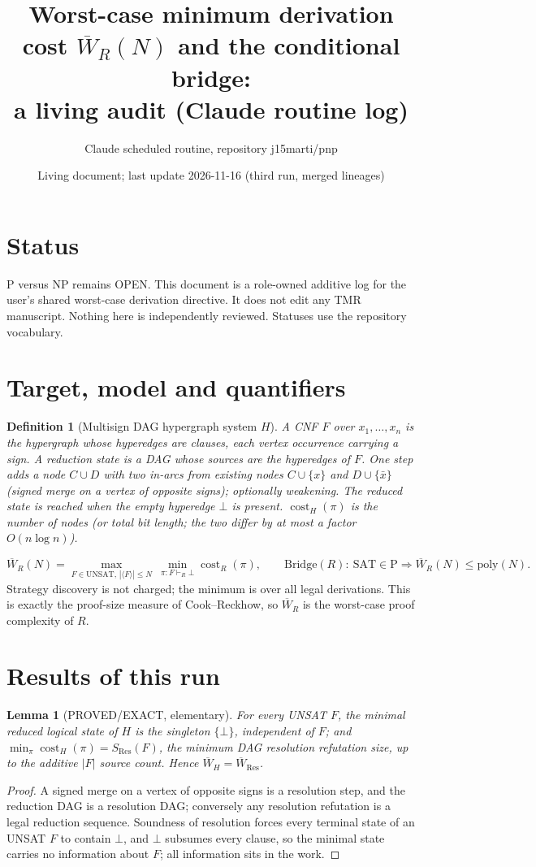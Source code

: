 \documentclass[11pt]{article}
\title{Worst-case minimum derivation cost $\overline W_R(N)$ and the conditional bridge:\\ a living audit (Claude routine log)}
\author{Claude scheduled routine, repository j15marti/pnp}
\date{Living document; last update 2026-11-16 (third run, merged lineages)}
\newtheorem{lemma}{Lemma}\newtheorem{theorem}{Theorem}\newtheorem{definition}{Definition}
\begin{document}
\maketitle

\section*{Status}
P versus NP remains OPEN. This document is a role-owned additive log for the user's
shared worst-case derivation directive. It does not edit any TMR manuscript. Nothing here
is independently reviewed. Statuses use the repository vocabulary.

\section{Target, model and quantifiers}
\begin{definition}[Multisign DAG hypergraph system $H$]
A CNF $F$ over $x_1,\dots,x_n$ is the hypergraph whose hyperedges are clauses, each vertex
occurrence carrying a sign. A reduction state is a DAG whose sources are the hyperedges
of $F$. One step adds a node $C\cup D$ with two in-arcs from existing nodes $C\cup\{x\}$ and
$D\cup\{\bar x\}$ (signed merge on a vertex of opposite signs); optionally weakening.
The reduced state is reached when the empty hyperedge $\bot$ is present.
$\operatorname{cost}_H(\pi)$ is the number of nodes (or total bit length; the two differ by at
most a factor $O(n\log n)$).
\end{definition}
\[
\overline W_R(N)=\max_{F\in\mathrm{UNSAT},\,|\langle F\rangle|\le N}\ \min_{\pi:F\vdash_R\bot}\operatorname{cost}_R(\pi),
\qquad \mathrm{Bridge}(R):\ \mathrm{SAT}\in\mathrm P\Rightarrow \overline W_R(N)\le\mathrm{poly}(N).
\]
Strategy discovery is not charged; the minimum is over all legal derivations. This is
exactly the proof-size measure of Cook--Reckhow, so $\overline W_R$ is the worst-case
proof complexity of $R$.

\section{Results of this run}
\begin{lemma}[PROVED/EXACT, elementary]\label{l:ident}
For every UNSAT $F$, the minimal reduced logical state of $H$ is the singleton $\{\bot\}$,
independent of $F$; and $\min_\pi \operatorname{cost}_H(\pi)=S_{\mathrm{Res}}(F)$, the minimum DAG
resolution refutation size, up to the additive $|F|$ source count. Hence
$\overline W_H=\overline W_{\mathrm{Res}}$.
\end{lemma}
\begin{proof}
A signed merge on a vertex of opposite signs is a resolution step, and the reduction
DAG is a resolution DAG; conversely any resolution refutation is a legal reduction
sequence. Soundness of resolution forces every terminal state of an UNSAT $F$ to contain
$\bot$, and $\bot$ subsumes every clause, so the minimal state carries no information
about $F$; all information sits in the work.
\end{proof}
\end{document}

